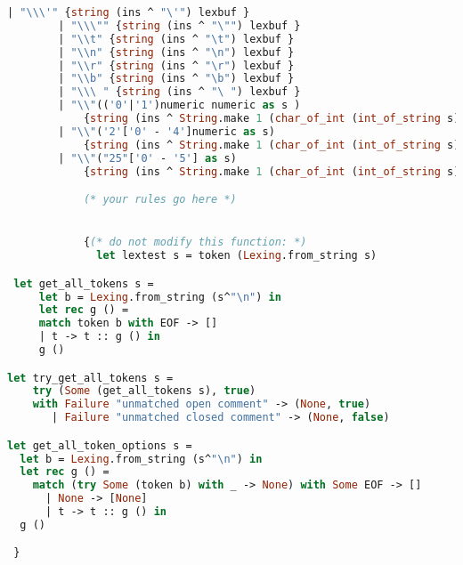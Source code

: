 \begin{lstlisting}[language=Caml, caption=tailRecPicoMLlex.mll]
        | "\\\'" {string (ins ^ "\'") lexbuf }
        | "\\\"" {string (ins ^ "\"") lexbuf }
        | "\\t" {string (ins ^ "\t") lexbuf }
        | "\\n" {string (ins ^ "\n") lexbuf }
        | "\\r" {string (ins ^ "\r") lexbuf }
        | "\\b" {string (ins ^ "\b") lexbuf }
        | "\\\ " {string (ins ^ "\ ") lexbuf }
        | "\\"(('0'|'1')numeric numeric as s )
            {string (ins ^ String.make 1 (char_of_int (int_of_string s))) lexbuf }
        | "\\"('2'['0' - '4']numeric as s) 
            {string (ins ^ String.make 1 (char_of_int (int_of_string s))) lexbuf }
        | "\\"("25"['0' - '5'] as s)
            {string (ins ^ String.make 1 (char_of_int (int_of_string s))) lexbuf }

            (* your rules go here *)


            {(* do not modify this function: *)
              let lextest s = token (Lexing.from_string s)

 let get_all_tokens s =
     let b = Lexing.from_string (s^"\n") in
     let rec g () =
     match token b with EOF -> []
     | t -> t :: g () in
     g ()

let try_get_all_tokens s =
    try (Some (get_all_tokens s), true)
    with Failure "unmatched open comment" -> (None, true)
       | Failure "unmatched closed comment" -> (None, false)

let get_all_token_options s =
  let b = Lexing.from_string (s^"\n") in
  let rec g () =
    match (try Some (token b) with _ -> None) with Some EOF -> []
      | None -> [None]
      | t -> t :: g () in
  g ()

 }
\end{lstlisting}